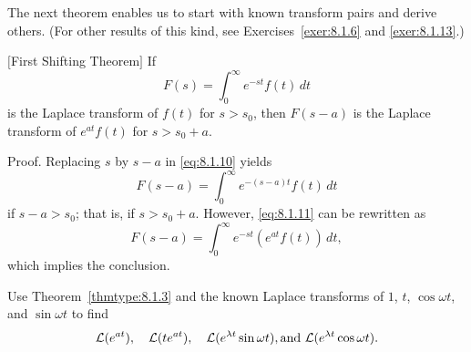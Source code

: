 
\noindent
The next theorem enables us to start with known transform pairs and derive others. (For other
results of this kind, see Exercises~\ref{exer:8.1.6} and \ref{exer:8.1.13}.)

\begin{theorem}
  \color{blue}
  $[$First Shifting Theorem$]$\label{thmtype:8.1.3} If
  \begin{equation}
    \label{eq:8.1.10}F(s)=\int_{0}^{\infty}e^{-st}f(t)\,dt
  \end{equation}
  is the Laplace transform of $f(t)$ for $s>s_{0}$, then $F(s-a)$ is the Laplace transform of
  $e^{at}f(t)$ for $s>s_{0}+a$.
\end{theorem}

{\sc Proof.} Replacing $s$ by $s-a$ in \eqref{eq:8.1.10} yields
\begin{equation}
  \label{eq:8.1.11}F(s-a)=\int_{0}^{\infty}e^{-(s-a)t}f(t)\,dt
\end{equation}
if $s-a>s_{0}$; that is, if $s>s_{0}+a$. However, \eqref{eq:8.1.11} can be rewritten as
\[
  F(s-a)=\int_{0}^{\infty}e^{-st}\left(e^{at}f(t)\right)\,dt,
\]
which implies the conclusion.

\begin{example}
  \label{example:8.1.7}\rm Use Theorem~\ref{thmtype:8.1.3} and the known Laplace transforms of $1$,
  $t$, $\cos\omega t$, and $\sin\omega t$ to find
  \[
    {\cal L}(e^{at}),\quad{\cal L}(te^{at}),\quad{\cal L}(e^{\lambda t}\sin \omega t),\mbox{and }{\cal L}(e^{\lambda t}\cos\omega t).
  \]
\end{example}

